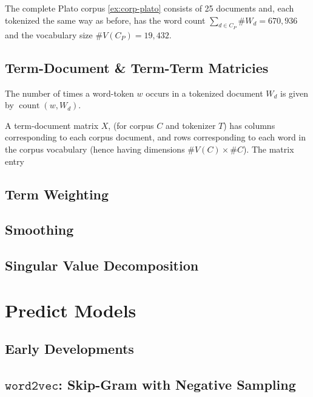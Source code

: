 \begin{example}
  The complete Plato corpus \ref{ex:corp-plato} consists of 25 documents and, each tokenized the same way as before, has the word count $\sum_{d\in C_P}\#W_d=670,936$ and the vocabulary size $\#V(C_P)=19,432$.
\end{example}
\vspace{6pt}

\subsection{Term-Document \& Term-Term Matricies}

\begin{definition}
  The number of times a word-token $w$ occurs in a tokenized document $W_d$ is given by $\operatorname{count}(w,W_d)$.
\end{definition}

\begin{definition}
  A term-document matrix $X$, (for corpus $C$ and tokenizer $T$) has columns corresponding to each corpus document, and rows corresponding to each word in the corpus vocabulary (hence having dimensions $\#V(C)\times \#C$). The matrix entry 
\end{definition}

\subsection{Term Weighting}

\subsection{Smoothing}

\subsection{Singular Value Decomposition}

\section{Predict Models}

\subsection{Early Developments}

\subsection{$\texttt{word2vec}$: Skip-Gram with Negative Sampling}

